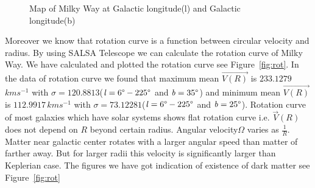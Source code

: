 \documentclass[conference]{IEEEtran}
\begin{document}
\begin{figure}[!t]
{\label{fig_fifth_case}}
\hfil
{}
\hfil
{}
\hfil
{}
\hfil
\caption{Map of Milky Way at Galactic longitude(l) and Galactic longitude(b)}
\label{fig:map}
\end{figure}

Moreover we know that rotation curve is a function between circular velocity and radius. By using SALSA Telescope we can calculate the rotation curve of Milky Way\cite{CathyHorellou2015}. We have calculated and plotted the rotation curve see Figure~\ref{fig:rot}. In the data of rotation curve we found that maximum mean $\vec{V(R)}$ is $233.1279$\,$kms^{-1}$ with $\sigma=120.8813$($\mathit{l}=6\degree-225\degree$ and $\mathit{b}=35\degree$) and minimum mean $\vec{V(R)}$ is $112.9917$\,$kms^{-1}$ with $\sigma=73.12281$($\mathit{l}=6\degree-225\degree$ and $\mathit{b}=25\degree$). Rotation curve of most galaxies which have solar systems shows flat rotation curve i.e. $\vec{V}(\mathit{R})$ does not depend on $\mathit{R}$ beyond certain radius. Angular velocity$\Omega$ varies as $\frac{1}{\mathit{R}}$. Matter near galactic center rotates with a larger angular speed than matter of farther away. But for larger radii this velocity is significantly larger than Keplerian case\cite{CathyHorellou2015}. The figures we have got indication of existence of dark matter see Figure~\ref{fig:rot}
\end{document}
